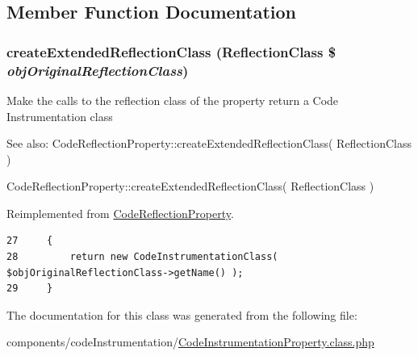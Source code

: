 \subsection{Member Function Documentation}
\hypertarget{class_code_instrumentation_property_6b56ec198bc6a5b5a72076e4e7c19e29}{
\subsubsection[{createExtendedReflectionClass}]{\setlength{\rightskip}{0pt plus 5cm}createExtendedReflectionClass (ReflectionClass \$ {\em objOriginalReflectionClass})}}
\label{class_code_instrumentation_property_6b56ec198bc6a5b5a72076e4e7c19e29}


Make the calls to the reflection class of the property return a Code Instrumentation class

\begin{Desc}
\item[See also:]CodeReflectionProperty::createExtendedReflectionClass( ReflectionClass ) 

CodeReflectionProperty::createExtendedReflectionClass( ReflectionClass ) \end{Desc}


Reimplemented from \hyperlink{class_code_reflection_property_6b56ec198bc6a5b5a72076e4e7c19e29}{CodeReflectionProperty}.

\begin{Code}\begin{verbatim}27     {
28         return new CodeInstrumentationClass( $objOriginalReflectionClass->getName() );
29     }
\end{verbatim}
\end{Code}




The documentation for this class was generated from the following file:\begin{CompactItemize}
\item 
components/codeInstrumentation/\hyperlink{_code_instrumentation_property_8class_8php}{CodeInstrumentationProperty.class.php}\end{CompactItemize}
